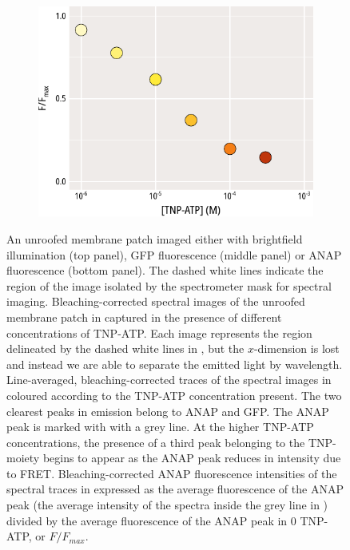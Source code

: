 \begin{figure}[h]
\begin{subfigure}[t]{0.45\textwidth}
	\end{subfigure}
	\hfill
	\begin{subfigure}[t]{0.45\textwidth}
		\caption{}\label{ch3fig:unroofed_intensities}
		\centering
		\includegraphics[width=\textwidth]{unroofed_intensities.pdf}
	\end{subfigure}
	\caption[Unroofed membranes spectral images]{
	 An unroofed membrane patch imaged either with brightfield illumination (top panel), GFP fluorescence (middle panel) or ANAP fluorescence (bottom panel).
	The dashed white lines indicate the region of the image isolated by the spectrometer mask for spectral imaging.
	 Bleaching-corrected spectral images of the unroofed membrane patch in  captured in the presence of different concentrations of TNP-ATP.
	Each image represents the region delineated by the dashed white lines in , but the $x$-dimension is lost and instead we are able to separate the emitted light by wavelength.
	 Line-averaged, bleaching-corrected traces of the spectral images in  coloured according to the TNP-ATP concentration present.
	The two clearest peaks in emission belong to ANAP and GFP.
	The ANAP peak is marked with with a grey line.
	At the higher TNP-ATP concentrations, the presence of a third peak belonging to the TNP-moiety begins to appear as the ANAP peak reduces in intensity due to FRET.
	 Bleaching-corrected ANAP fluorescence intensities of the spectral traces in  expressed as the average fluorescence of the ANAP peak (the average intensity of the spectra inside the grey line in ) divided by the average fluorescence of the ANAP peak in $0$ TNP-ATP, or $F/F_{max}$.
	}
\end{figure}

